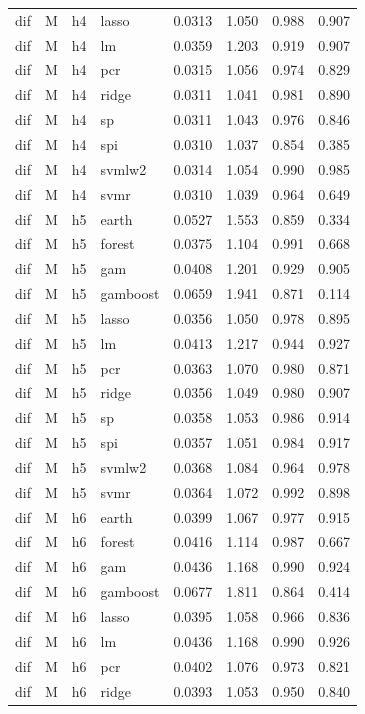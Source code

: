 \begin{ThreePartTable}
\begin{longtable}[t]{llclcccc}
dif & M & h4 & lasso & 0.0313 & 1.050 & 0.988 & 0.907\\
dif & M & h4 & lm & 0.0359 & 1.203 & 0.919 & 0.907\\
dif & M & h4 & pcr & 0.0315 & 1.056 & 0.974 & 0.829\\
dif & M & h4 & ridge & 0.0311 & 1.041 & 0.981 & 0.890\\
dif & M & h4 & sp & 0.0311 & 1.043 & 0.976 & 0.846\\
dif & M & h4 & spi & 0.0310 & 1.037 & 0.854 & 0.385\\
dif & M & h4 & svmlw2 & 0.0314 & 1.054 & 0.990 & 0.985\\
dif & M & h4 & svmr & 0.0310 & 1.039 & 0.964 & 0.649\\
\addlinespace
dif & M & h5 & earth & 0.0527 & 1.553 & 0.859 & 0.334\\
dif & M & h5 & forest & 0.0375 & 1.104 & 0.991 & 0.668\\
dif & M & h5 & gam & 0.0408 & 1.201 & 0.929 & 0.905\\
dif & M & h5 & gamboost & 0.0659 & 1.941 & 0.871 & 0.114\\
dif & M & h5 & lasso & 0.0356 & 1.050 & 0.978 & 0.895\\
dif & M & h5 & lm & 0.0413 & 1.217 & 0.944 & 0.927\\
dif & M & h5 & pcr & 0.0363 & 1.070 & 0.980 & 0.871\\
dif & M & h5 & ridge & 0.0356 & 1.049 & 0.980 & 0.907\\
dif & M & h5 & sp & 0.0358 & 1.053 & 0.986 & 0.914\\
dif & M & h5 & spi & 0.0357 & 1.051 & 0.984 & 0.917\\
dif & M & h5 & svmlw2 & 0.0368 & 1.084 & 0.964 & 0.978\\
dif & M & h5 & svmr & 0.0364 & 1.072 & 0.992 & 0.898\\
\addlinespace
dif & M & h6 & earth & 0.0399 & 1.067 & 0.977 & 0.915\\
dif & M & h6 & forest & 0.0416 & 1.114 & 0.987 & 0.667\\
dif & M & h6 & gam & 0.0436 & 1.168 & 0.990 & 0.924\\
dif & M & h6 & gamboost & 0.0677 & 1.811 & 0.864 & 0.414\\
dif & M & h6 & lasso & 0.0395 & 1.058 & 0.966 & 0.836\\
dif & M & h6 & lm & 0.0436 & 1.168 & 0.990 & 0.926\\
dif & M & h6 & pcr & 0.0402 & 1.076 & 0.973 & 0.821\\
dif & M & h6 & ridge & 0.0393 & 1.053 & 0.950 & 0.840\\

\end{longtable}
\end{ThreePartTable}
